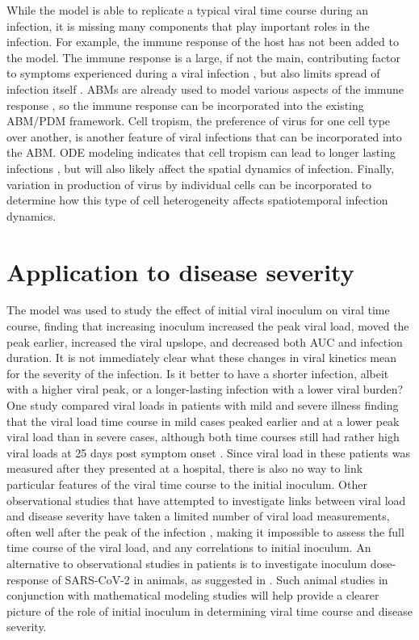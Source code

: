 While the model is able to replicate a typical viral time course during an infection, it is missing many components that play important roles in the infection. For example, the immune response of the host has not been added to the model. The immune response is a large, if not the main, contributing factor to symptoms experienced during a viral infection \citep{manchanda14,zheng18}, but also limits spread of infection itself \citep{dobrovolny13}. ABMs are already used to model various aspects of the immune response \citep{whitman20,kerepesi19,levin16}, so the immune response can be incorporated into the existing ABM/PDM framework. Cell tropism, the preference of virus for one cell type over another, is another feature of viral infections that can be incorporated into the ABM. ODE modeling indicates that cell tropism can lead to longer lasting infections \citep{dobrovolny10}, but will also likely affect the spatial dynamics of infection. Finally, variation in production of virus by individual cells \citep{timm12} can be incorporated to determine how this type of cell heterogeneity affects spatiotemporal infection dynamics.


\section{Application to disease severity}

The model was used to study the effect of initial viral inoculum on viral time course, finding that increasing inoculum increased the peak viral load, moved the peak earlier, increased the viral upslope, and decreased both AUC and infection duration. It is not immediately clear what these changes in viral kinetics mean for the severity of the infection. Is it better to have a shorter infection, albeit with a higher viral peak, or a longer-lasting infection with a lower viral burden? One study compared viral loads in patients with mild and severe illness finding that the viral load time course in mild cases peaked earlier and at a lower peak viral load than in severe cases, although both time courses still had rather high viral loads at 25 days post symptom onset \citep{zheng20}. Since viral load in these patients was measured after they presented at a hospital, there is also no way to link particular features of the viral time course to the initial inoculum. Other observational studies that have attempted to investigate links between viral load and disease severity have taken a limited number of viral load measurements, often well after the peak of the infection \citep{liu20, liu20imm,to20}, making it impossible to assess the full time course of the viral load, and any correlations to initial inoculum. An alternative to observational studies in patients is to investigate inoculum dose-response of SARS-CoV-2 in animals, as suggested in \citep{little20}. Such animal studies in conjunction with mathematical modeling studies will help provide a clearer picture of the role of initial inoculum in determining viral time course and disease severity.

